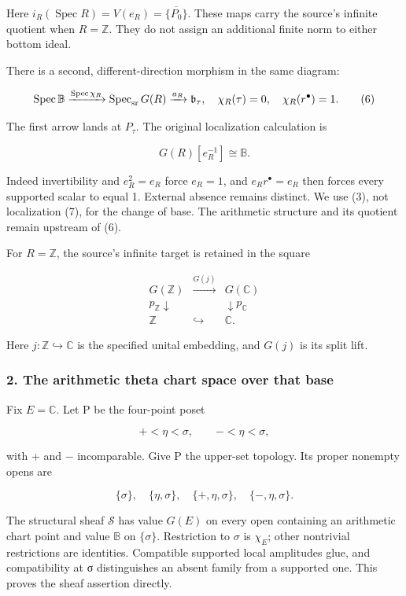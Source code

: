 Here \(i_R(\operatorname{Spec}R)=V(e_R)=\overline{\{P_0\}}\). These maps carry the source's infinite quotient when \(R=\mathbb Z\). They do not assign an additional finite norm to either bottom ideal.

There is a second, different-direction morphism in the same diagram:

\[
\operatorname{Spec}\mathbb B\xrightarrow{\operatorname{Spec}\chi_R}
\operatorname{Spec}_{\rm sr}G(R)\xrightarrow{a_R}\mathfrak b_\tau,
\quad
\chi_R(\tau)=0,\quad\chi_R(r^\bullet)=1.
\tag{6}
\]

The first arrow lands at \(P_\tau\). The original localization calculation is

\[
G(R)[e_R^{-1}]\cong\mathbb B.
\tag{7}
\]

Indeed invertibility and \(e_R^2=e_R\) force \(e_R=1\), and \(e_Rr^\bullet=e_R\) then forces every supported scalar to equal 1. External absence remains distinct. We use (3), not localization (7), for the change of base. The arithmetic structure and its quotient remain upstream of (6).

For \(R=\mathbb Z\), the source's infinite target is retained in the square

\[
\begin{array}{ccc}
G(\mathbb Z)&\xrightarrow{G(j)}&G(\mathbb C)\\
p_{\mathbb Z}\downarrow&&\downarrow p_{\mathbb C}\\
\mathbb Z&\hookrightarrow&\mathbb C.
\end{array}
\tag{8}
\]

Here \(j:\mathbb Z\hookrightarrow\mathbb C\) is the specified unital embedding, and \(G(j)\) is its split lift.

\subsubsection{2. The arithmetic theta chart space over that base}\label{endpoint-tau_base--the-arithmetic-theta-chart-space-over-that-base}

Fix \(E=\mathbb C\). Let P be the four-point poset

\[
+<\eta<\sigma,\qquad -<\eta<\sigma,
\tag{9}
\]

with + and − incomparable. Give P the upper-set topology. Its proper nonempty opens are

\[
\{\sigma\},\quad\{\eta,\sigma\},\quad
\{+,\eta,\sigma\},\quad\{-,\eta,\sigma\}.
\]

The structural sheaf \(\mathcal S\) has value \(G(E)\) on every open containing an arithmetic chart point and value \(\mathbb B\) on \(\{\sigma\}\). Restriction to \(\sigma\) is \(\chi_E\); other nontrivial restrictions are identities. Compatible supported local amplitudes glue, and compatibility at σ distinguishes an absent family from a supported one. This proves the sheaf assertion directly.


